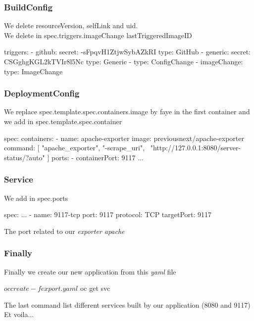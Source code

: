 \documentclass{beamer}
\begin{document}
\begin{frame}[fragile]
  \frametitle{BuildConfig}
  We delete resourceVersion, selfLink and uid. \\
  We delete in spec.triggers.imageChange lastTriggeredImageID
  \begin{yamlcode}
    triggers:                                                                                                       
    - github:                                                                                                       
        secret: -sFpqvH1ZtjwSybAZkRI                                                                                
      type: GitHub                                                                                                  
    - generic:                                                                                                      
      secret: CSGghgKGL2kTVIr8l5Nc                                                                                
      type: Generic                                                                                                 
    - type: ConfigChange                                                                                            
    - imageChange:                                                                                                  
      type: ImageChange
  \end{yamlcode}
\end{frame}

\begin{frame}[fragile]
  \frametitle{DeploymentConfig}
  We replace spec.template.spec.containers.image by faye in the first container and we add in spec.template.spec.container
  \begin{yamlcode}
    spec:
      containers: 
      - name: apache-exporter
        image: previousnext/apache-exporter
        command: [ "apache_exporter", "-scrape_uri", \
        "http://127.0.0.1:8080/server-status/?auto" ]
        ports:
        - containerPort: 9117
      ...
  \end{yamlcode}
\end{frame}

\begin{frame}[fragile]
  \frametitle{Service}
  We add in spec.ports
  \begin{yamlcode}
    spec:                                                                                                             
      ...
      - name: 9117-tcp
        port: 9117
        protocol: TCP
        targetPort: 9117
  \end{yamlcode}
  The port related to our \emph{exporter apache}
\end{frame}

\begin{frame}[fragile]
  \frametitle{Finally}
  Finally we create our new application from this \emph{yaml} file
  \begin{bashcode}
    $ oc create -f export.yaml
    $ oc get svc 
  \end{bashcode}
  The last command list different services built by our application (8080 and 9117)\\
  Et voila...
\end{frame}
\end{document}
